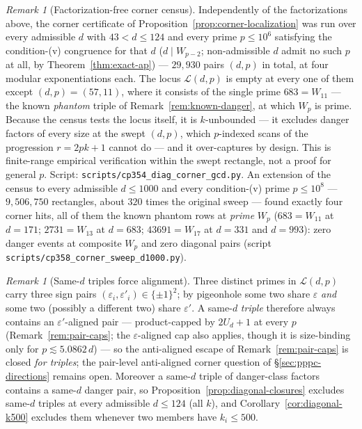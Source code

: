 \documentclass[11pt]{amsart}
\theoremstyle{plain}
\theoremstyle{definition}
\theoremstyle{remark}
\newtheorem{remark}[theorem]{Remark}
\numberwithin{equation}{section}
\begin{document}
\begin{remark}[Factorization-free corner census]\label{rem:corner-sweep}
Independently of the factorizations above, the corner certificate of Proposition~\ref{prop:corner-localization} was run over every admissible $d$ with $43 < d \leq 124$ and every prime $p \leq 10^6$ satisfying the condition-(v) congruence for that $d$ ($d \mid W_{p-2}$; non-admissible $d$ admit no such $p$ at all, by Theorem~\ref{thm:exact-ap}) --- $29{,}930$ pairs $(d, p)$ in total, at four modular exponentiations each. The locus $\mathcal{L}(d, p)$ is empty at every one of them except $(d, p) = (57, 11)$, where it consists of the single prime $683 = W_{11}$ --- the known \emph{phantom} triple of Remark~\ref{rem:known-danger}, at which $W_p$ is prime. Because the census tests the locus itself, it is $k$-unbounded --- it excludes danger factors of every size at the swept $(d, p)$, which $p$-indexed scans of the progression $r = 2 p k + 1$ cannot do --- and it over-captures by design. This is finite-range empirical verification within the swept rectangle, not a proof for general $p$. Script: \texttt{scripts/cp354\_diag\_corner\_gcd.py}. An extension of the census to every admissible $d \leq 1000$ and every condition-(v) prime $p \leq 10^8$ --- $9{,}506{,}750$ rectangles, about $320$ times the original sweep --- found exactly four corner hits, all of them the known phantom rows at \emph{prime} $W_p$ ($683 = W_{11}$ at $d = 171$; $2731 = W_{13}$ at $d = 683$; $43691 = W_{17}$ at $d = 331$ and $d = 993$): zero danger events at composite $W_p$ and zero diagonal pairs (script \texttt{scripts/}\allowbreak\texttt{cp358\_corner\_sweep\_d1000.py}).
\end{remark}

\begin{remark}[Same-$d$ triples force alignment]\label{rem:same-d-triples}
Three distinct primes in $\mathcal{L}(d, p)$ carry three sign pairs $(\varepsilon_i, \varepsilon'_i) \in \{\pm 1\}^2$; by pigeonhole some two share $\varepsilon$ \emph{and} some two (possibly a different two) share $\varepsilon'$. A same-$d$ \emph{triple} therefore always contains an $\varepsilon'$-aligned pair --- product-capped by $2 U_d + 1$ at every $p$ (Remark~\ref{rem:pair-caps}; the $\varepsilon$-aligned cap also applies, though it is size-binding only for $p \lesssim 5.0862\, d$) --- so the anti-aligned escape of Remark~\ref{rem:pair-caps} is closed \emph{for triples}; the pair-level anti-aligned corner question of \S\ref{sec:pppc-directions} remains open. Moreover a same-$d$ triple of danger-class factors contains a same-$d$ danger pair, so Proposition~\ref{prop:diagonal-closures} excludes same-$d$ triples at every admissible $d \leq 124$ (all $k$), and Corollary~\ref{cor:diagonal-k500} excludes them whenever two members have $k_i \leq 500$.
\end{remark}
\end{document}
